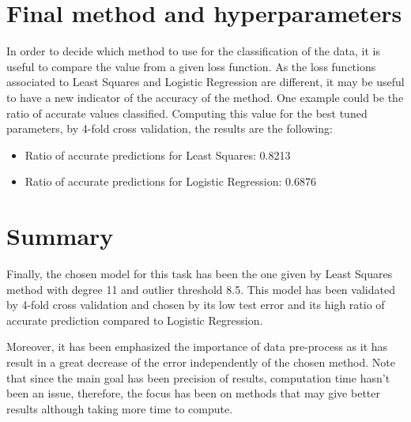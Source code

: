 \documentclass[10pt,conference]{IEEEtran}
\begin{document}
\section{Final method and hyperparameters}

In order to decide which method to use for the classification of the data, it is useful to compare the value from a given loss function. As the loss functions associated to Least Squares and Logistic Regression are different, it may be useful to have a new indicator of the accuracy of the method. One example could be the ratio of accurate values classified. Computing this value for the best tuned parameters, by 4-fold cross validation, the results are the following:

\begin{itemize}
\item{}Ratio of accurate predictions for Least Squares: 0.8213
\item{}Ratio of accurate predictions for Logistic Regression: 0.6876
\end{itemize}

\section{Summary}

Finally, the chosen model for this task has been the one given by Least Squares method with degree 11 and outlier threshold 8.5. This model has been validated by 4-fold cross validation and chosen by its low test error and its high ratio of accurate prediction compared to Logistic Regression. 

Moreover, it has been emphasized the importance of data pre-process as it has result in a great decrease of the error independently of the chosen method. Note that since the main goal has been precision of results, computation time hasn't been an issue, therefore, the focus has been on methods that may give better results although taking more time to compute.
\end{document}
